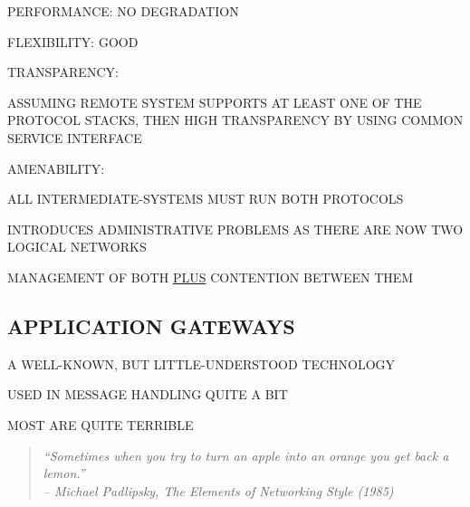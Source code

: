

\begin{bwslide}

\begin{nrtc}
\item	PERFORMANCE: NO DEGRADATION

\item	FLEXIBILITY: GOOD

\item	TRANSPARENCY:
    \begin{nrtc}
    \item	ASSUMING REMOTE SYSTEM SUPPORTS AT LEAST ONE OF THE PROTOCOL
		STACKS, THEN HIGH TRANSPARENCY BY USING COMMON SERVICE
		INTERFACE
    \end{nrtc}

\item	AMENABILITY:
    \begin{nrtc}
    \item	ALL INTERMEDIATE-SYSTEMS MUST RUN BOTH PROTOCOLS

    \item	INTRODUCES ADMINISTRATIVE PROBLEMS AS THERE ARE NOW TWO
		LOGICAL NETWORKS
	\begin{nrtc}
	\item	MANAGEMENT OF BOTH \underline{PLUS} CONTENTION BETWEEN THEM
	\end{nrtc}
    \end{nrtc}
\end{nrtc}
\end{bwslide}


\begin{bwslide}
\part*	{APPLICATION GATEWAYS}\bf

\begin{nrtc}
\item	A WELL-KNOWN, BUT LITTLE-UNDERSTOOD TECHNOLOGY
    \begin{nrtc}
    \item	USED IN MESSAGE HANDLING QUITE A BIT
    \end{nrtc}

\item	MOST ARE QUITE TERRIBLE
\begin{quote}\em
``Sometimes when you try to turn an apple into an orange you get back a
lemon.''\\ \raggedleft
-- Michael Padlipsky, The Elements of Networking Style (1985)
\end{quote}
\end{nrtc}
\end{bwslide}


